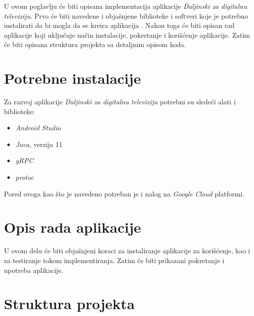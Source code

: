 \documentclass[../TamaraIvanovicMasterRad.tex]{subfiles}
\begin{document}
U ovom poglavlju će biti opisana implementacija aplikacije \textit{Daljinski za digitalnu televiziju}. Prvo će biti navedene i objašnjene biblioteke i softveri koje je potrebno instalirati da bi mogla da se kreira aplikacija . Nakon toga će biti opisan rad aplikacije koji uključuje način instalacije, pokretanje i korišćenje aplikacije. Zatim će biti opisana struktura projekta sa detaljnim opisom koda.

\section{Potrebne instalacije} 
Za razvoj aplikacije \textit{Daljinski za digitalnu televiziju} potrebni su sledeći alati i biblioteke:
\begin{itemize}
    \item \textit{Android Studio}
    \item \textit{Java}, verzija 11
    \item \textit{gRPC}
    \item \textit{protoc}
\end{itemize}
Pored ovoga kao što je navedeno potreban je i nalog na \textit{Google Cloud} platformi.
\section{Opis rada aplikacije} \label{opis_rada}
U ovom delu će biti objašnjeni koraci za instaliranje aplikacije za korišćenje, kao i za testiranje tokom implementiranja. Zatim će biti prikazani pokretanje i upotreba aplikacije. 





\section{Struktura projekta}


\end{document}

